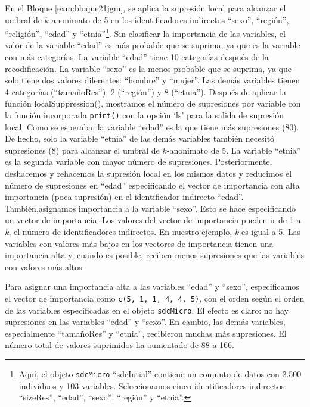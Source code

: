 \documentclass[]{book}
\theoremstyle{definition}
\theoremstyle{definition}
\theoremstyle{definition}
\theoremstyle{definition}
\theoremstyle{remark}
\begin{document}
En el Bloque \ref{exm:bloque21jgm}, se aplica la supresión local para alcanzar el umbral de \(k\)-anonimato de 5 en los identificadores indirectos ``sexo'', ``región'', ``religión'', ``edad'' y ``etnia''\footnote{Aquí, el objeto \texttt{sdcMicro} ``sdcIntial'' contiene un conjunto de datos con 2.500 individuos y 103 variables. Seleccionamos cinco identificadores indirectos: ``sizeRes'', ``edad'', ``sexo'', ``región'' y ``etnia''.}. Sin clasificar la importancia de las variables, el valor de la variable ``edad'' es más probable que se suprima, ya que es la variable con más categorías. La variable ``edad'' tiene 10 categorías después de la recodificación. La variable ``sexo'' es la menos probable que se suprima, ya que solo tiene dos valores diferentes: ``hombre'' y ``mujer''. Las demás variables tienen 4 categorías (``tamañoRes''), 2 (``región'') y 8 (``etnia''). Después de aplicar la función localSuppression(), mostramos el número de supresiones por variable con la función incorporada \texttt{print()} con la opción `ls' para la salida de supresión local. Como se esperaba, la variable ``edad'' es la que tiene más supresiones (80). De hecho, solo la variable ``etnia'' de las demás variables también necesitó supresiones (8) para alcanzar el umbral de \(k\)-anonimato de 5. La variable ``etnia'' es la segunda variable con mayor número de supresiones. Posteriormente, deshacemos y rehacemos la supresión local en los mismos datos y reducimos el número de supresiones en ``edad'' especificando el vector de importancia con alta importancia (poca supresión) en el identificador indirecto ``edad''. También,asignamos importancia a la variable ``sexo''. Esto se hace especificando un vector de importancia. Los valores del vector de importancia pueden ir de 1 a \emph{k}, el número de identificadores indirectos. En nuestro ejemplo, \emph{k} es igual a 5. Las variables con valores más bajos en los vectores de importancia tienen una importancia alta y, cuando es posible, reciben menos supresiones que las variables con valores más altos.

Para asignar una importancia alta a las variables ``edad'' y ``sexo'', especificamos el vector de importancia como \texttt{c(5,\ 1,\ 1,\ 4,\ 4,\ 5)}, con el orden según el orden de las variables especificadas en el objeto \texttt{sdcMicro}. El efecto es claro: no hay supresiones en las variables ``edad'' y ``sexo''. En cambio, las demás variables, especialmente ``tamañoRes'' y ``etnia'', recibieron muchas más supresiones. El número total de valores suprimidos ha aumentado de 88 a 166.
\end{document}
